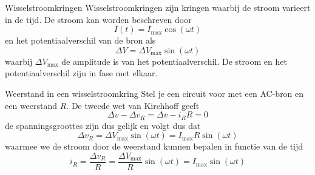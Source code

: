 \begin{theo}[Wisselstroomkringen]{Wisselstroomkringen}
    Wisselstroomkringen zijn kringen waarbij de stroom varieert in de tijd. De stroom kan worden beschreven door
    \begin{equation*}
        I(t) = I_{\max}\cos(\omega t)
    \end{equation*}
    en het potentiaalverschil van de bron als
    \begin{equation*}
        \Delta V = \Delta V_{\max}\sin(\omega t)
    \end{equation*}
    waarbij $\Delta V_{\max}$ de amplitude is van het potentiaalverschil. De stroom en het potentiaalverschil zijn in fase met elkaar.
\end{theo}

\begin{pro}{Weerstand in een wisselstroomkring}
    Stel je een circuit voor met een AC-bron en een weerstand $R$. De tweede wet van Kirchhoff geeft
    \begin{equation*}
        \Delta v - \Delta v_{R} = \Delta v - i_R R = 0
    \end{equation*}
    de spanningsgroottes zijn dus gelijk en volgt dus dat
    \begin{equation*}
        \Delta v_{R} = \Delta V_{\max}\sin(\omega t) = I_{\max}R\sin(\omega t)
    \end{equation*}
    waarmee we de stroom door de weerstand kunnen bepalen in functie van de tijd
    \begin{equation*}
        i_R = \dfrac{\Delta v_{R}}{R} = \dfrac{\Delta V_{\max}}{R}\sin(\omega t) = I_{\max}\sin(\omega t) 
    \end{equation*}
    \vspace{-0.5cm}
\end{pro}

\newpage

